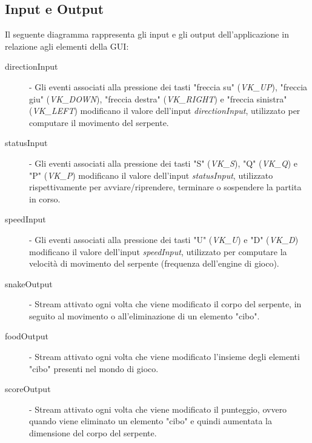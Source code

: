 \documentclass[../main.tex]{subfiles}
\begin{document}
\subsection{Input e Output}
Il seguente diagramma rappresenta gli input e gli output dell'applicazione in relazione agli elementi della GUI:
\begin{description}
  \item[directionInput] - Gli eventi associati alla pressione dei tasti "freccia su" (\textit{VK\_UP}), "freccia giu" (\textit{VK\_DOWN}), "freccia destra" (\textit{VK\_RIGHT}) e "freccia sinistra" (\textit{VK\_LEFT}) modificano il valore dell'input \textit{directionInput}, utilizzato per computare il movimento del serpente.
  \item[statusInput] - Gli eventi associati alla pressione dei tasti "S" (\textit{VK\_S}), "Q" (\textit{VK\_Q}) e "P" (\textit{VK\_P}) modificano il valore dell'input \textit{statusInput}, utilizzato rispettivamente per avviare/riprendere, terminare o sospendere la partita in corso.
  \item[speedInput] - Gli eventi associati alla pressione dei tasti "U" (\textit{VK\_U}) e "D" (\textit{VK\_D}) modificano il valore dell'input \textit{speedInput}, utilizzato per computare la velocità di movimento del serpente (frequenza dell'engine di gioco).
  \item[snakeOutput] - Stream attivato ogni volta che viene modificato il corpo del serpente, in seguito al movimento o all'eliminazione di un elemento "cibo".
  \item[foodOutput] - Stream attivato ogni volta che viene modificato l'insieme degli elementi "cibo" presenti nel mondo di gioco.
  \item[scoreOutput] - Stream attivato ogni volta che viene modificato il punteggio, ovvero quando viene eliminato un elemento "cibo" e quindi aumentata la dimensione del corpo del serpente.
\end{description}
\end{document}
